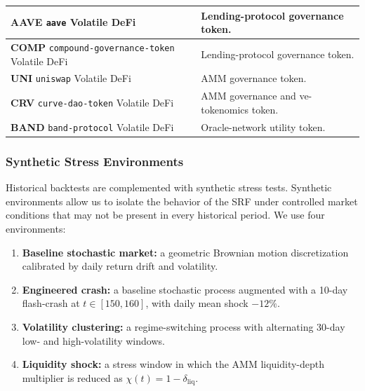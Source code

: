 \documentclass[a4paper,fleqn]{cas-dc}
\begin{document}
\begin{table}[!t]
\begin{tabular}{|p{}|p{}|}
\textbf{AAVE}\newline
\texttt{aave}\newline
Volatile DeFi &
Lending-protocol governance token. \\
\hline

\textbf{COMP}\newline
\texttt{compound-governance-token}\newline
Volatile DeFi &
Lending-protocol governance token. \\
\hline

\textbf{UNI}\newline
\texttt{uniswap}\newline
Volatile DeFi &
AMM governance token. \\
\hline

\textbf{CRV}\newline
\texttt{curve-dao-token}\newline
Volatile DeFi &
AMM governance and ve-tokenomics token. \\
\hline

\textbf{BAND}\newline
\texttt{band-protocol}\newline
Volatile DeFi &
Oracle-network utility token. \\
\hline

\end{tabular}
\end{table}

\subsubsection{Synthetic Stress Environments}

Historical backtests are complemented with synthetic stress tests. Synthetic environments allow us to isolate the behavior of the SRF under controlled market conditions that may not be present in every historical period. We use four environments:

\begin{enumerate}
    \item \textbf{Baseline stochastic market:} a geometric Brownian motion discretization calibrated by daily return drift and volatility.
    \item \textbf{Engineered crash:} a baseline stochastic process augmented with a 10-day flash-crash at \(t\in[150,160]\), with daily mean shock \(-12\%\).
    \item \textbf{Volatility clustering:} a regime-switching process with alternating 30-day low- and high-volatility windows.
    \item \textbf{Liquidity shock:} a stress window in which the AMM liquidity-depth multiplier is reduced as \(\chi(t)=1-\delta_{\mathrm{liq}}\).
\end{enumerate}
\end{document}
